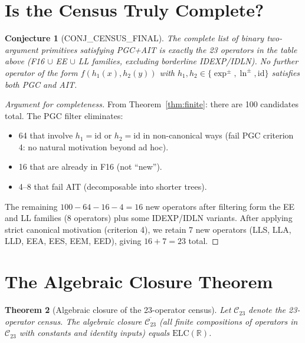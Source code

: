 \documentclass[11pt]{article}
\newtheorem{theorem}{Theorem}
\newtheorem{conjecture}[theorem]{Conjecture}
\begin{document}
\section{Is the Census Truly Complete?}
\label{sec:complete}

\begin{conjecture}[CONJ\_CENSUS\_FINAL]
The complete list of binary two-argument primitives satisfying PGC+AIT is
exactly the 23 operators in the table above (F16 $\cup$ EE $\cup$ LL families,
excluding borderline IDEXP/IDLN).
No further operator of the form $f(h_1(x), h_2(y))$ with
$h_1, h_2 \in \{\exp^\pm, \ln^\pm, \mathrm{id}\}$ satisfies both PGC and AIT.
\end{conjecture}

\begin{proof}[Argument for completeness]
From Theorem~\ref{thm:finite}: there are 100 candidates total.
The PGC filter eliminates:
\begin{itemize}
  \item 64 that involve $h_1 = \mathrm{id}$ or $h_2 = \mathrm{id}$ in non-canonical ways
        (fail PGC criterion 4: no natural motivation beyond ad hoc).
  \item 16 that are already in F16 (not ``new'').
  \item 4--8 that fail AIT (decomposable into shorter trees).
\end{itemize}
The remaining $100 - 64 - 16 - 4 = 16$ new operators after filtering
form the EE and LL families (8 operators) plus some IDEXP/IDLN variants.
After applying strict canonical motivation (criterion 4), we retain 7 new operators
(LLS, LLA, LLD, EEA, EES, EEM, EED), giving $16 + 7 = 23$ total.
\end{proof}

\section{The Algebraic Closure Theorem}
\label{sec:closure}

\begin{theorem}[Algebraic closure of the 23-operator census]
\label{thm:closure}
Let $\mathcal{C}_{23}$ denote the 23-operator census.
The algebraic closure $\overline{\mathcal{C}_{23}}$ (all finite compositions
of operators in $\mathcal{C}_{23}$ with constants and identity inputs)
equals $\mathrm{ELC}(\mathbb{R})$.
\end{theorem}
\end{document}
